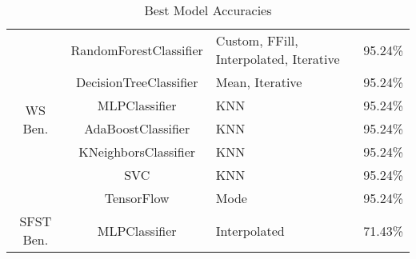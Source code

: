 \begin{table}[H]
\begin{tabular}{|c|c|p{4cm}|c|}
\multirow{7}{*}{WS Ben.} & RandomForestClassifier & Custom, FFill, Interpolated, Iterative & 95.24\% \\
 & DecisionTreeClassifier & Mean, Iterative & 95.24\% \\
 & MLPClassifier & KNN & 95.24\% \\
 & AdaBoostClassifier & KNN & 95.24\% \\
 & KNeighborsClassifier & KNN & 95.24\% \\
 & SVC & KNN & 95.24\% \\
 & TensorFlow & Mode & 95.24\% \\
\hline

SFST Ben. & MLPClassifier & Interpolated & 71.43\% \\
\hline

\end{tabular}
\caption{Best Model Accuracies}
\label{tab_class:spec_model_accuracies_best}
\end{table}
